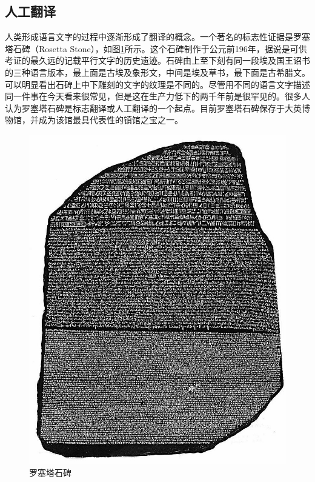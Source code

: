 
\subsection{人工翻译}

\parinterval 人类形成语言文字的过程中逐渐形成了翻译的概念。一个著名的标志性证据是罗塞塔石碑（Rosetta Stone），如图\ref{fig:1-3}所示。这个石碑制作于公元前196年，据说是可供考证的最久远的记载平行文字的历史遗迹。石碑由上至下刻有同一段埃及国王诏书的三种语言版本，最上面是古埃及象形文，中间是埃及草书，最下面是古希腊文。可以明显看出石碑上中下雕刻的文字的纹理是不同的。尽管用不同的语言文字描述同一件事在今天看来很常见，但是这在生产力低下的两千年前是很罕见的。很多人认为罗塞塔石碑是标志翻译或人工翻译的一个起点。目前罗塞塔石碑保存于大英博物馆，并成为该馆最具代表性的镇馆之宝之一。

\begin{figure}[htp]
    \centering
\includegraphics[scale=0.20]{./Chapter1/Figures/figure-rosetta-stone.jpg}
    \caption{罗塞塔石碑}
    \label{fig:1-3}
\end{figure}

